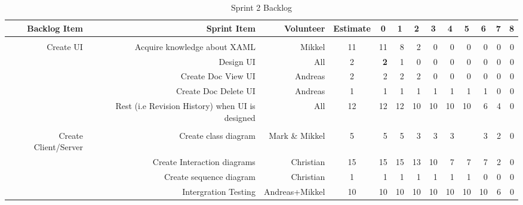 \documentclass[a4paper,11pt,report]{report}
\begin{document}
\begin{landscape}
\begin{table}[htbp]
  \centering
  \caption{Sprint 2 Backlog}
    \begin{tabular}{rrrrrrrrrrrrr}
				\hline \hline
    \textbf{Backlog Item} & \textbf{Sprint Item} & \textbf{Volunteer} & \multicolumn{1}{c}{\textbf{Estimate}} & \multicolumn{1}{c}{\textbf{0}} & \multicolumn{1}{c}{\textbf{1}} & \multicolumn{1}{c}{\textbf{2}} & \multicolumn{1}{c}{\textbf{3}} & \multicolumn{1}{c}{\textbf{4}} & \multicolumn{1}{c}{\textbf{5}} & \multicolumn{1}{c}{\textbf{6}} & \multicolumn{1}{c}{\textbf{7}} & \multicolumn{1}{c}{\textbf{8}} \\
				\hline
          &       &       &       &       &       &       &       &       &       &       &       &  \\
    Create UI & Acquire knowledge about XAML & Mikkel & \multicolumn{1}{c}{11} & 11    & 8     & 2     & 0     & 0     & 0     & 0     & 0     & 0 \\
          & Design UI & All   & \multicolumn{1}{c}{2} & \textbf{2} & 1     & 0     & 0     & 0     & 0     & 0     & 0     & 0 \\
          & Create Doc View UI & Andreas & \multicolumn{1}{c}{2} & 2     & 2     & 2     & 0     & 0     & 0     & 0     & 0     & 0 \\
          & Create Doc Delete UI & Andreas & \multicolumn{1}{c}{1} & 1     & 1     & 1     & 1     & 1     & 1     & 1     & 0     & 0 \\
          & Rest (i.e Revision History) when UI is designed & All   & \multicolumn{1}{c}{12} & 12    & 12    & 10    & 10    & 10    & 10    & 6     & 4     & 0 \\
          &       &       & \multicolumn{1}{c}{} &       &       &       &       &       &       &       &       &  \\
    Create Client/Server & Create class diagram & Mark \& Mikkel & \multicolumn{1}{c}{5} & 5     & 5     & 3     & 3     & 3     &       & 3     & 2     & 0 \\
          & Create Interaction diagrams & Christian & \multicolumn{1}{c}{15} & 15    & 15    & 13    & 10    & 7     & 7     & 7     & 2     & 0 \\
          & Create sequence diagram & Christian & \multicolumn{1}{c}{1} & 1     & 1     & 1     & 1     & 1     & 1     & 0     & 0     & 0 \\
          & Intergration Testing  & Andreas+Mikkel & \multicolumn{1}{c}{10} & 10    & 10    & 10    & 10    & 10    & 10    & 10    & 6     & 0 \\

\end{tabular}
\end{table}
\end{landscape}
\end{document}
